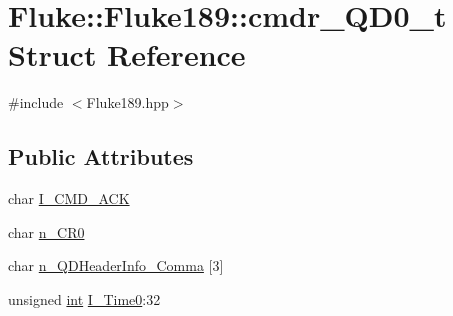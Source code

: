 \hypertarget{structFluke_1_1Fluke189_1_1cmdr__QD0__t}{
\section{Fluke::Fluke189::cmdr\_\-QD0\_\-t Struct Reference}
\label{structFluke_1_1Fluke189_1_1cmdr__QD0__t}
}


{\ttfamily \#include $<$Fluke189.hpp$>$}\subsection*{Public Attributes}
\begin{DoxyCompactItemize}
\item 
char \hyperlink{structFluke_1_1Fluke189_1_1cmdr__QD0__t_ab46dd039cec29950bccb5090537d6272}{I\_\-CMD\_\-ACK}
\item 
char \hyperlink{structFluke_1_1Fluke189_1_1cmdr__QD0__t_a052cc7ae576b3634f2eb8e1a4587c29e}{n\_\-CR0}
\item 
char \hyperlink{structFluke_1_1Fluke189_1_1cmdr__QD0__t_adbec2e8d0ea53d60baa33f2bad91e272}{n\_\-QDHeaderInfo\_\-Comma} \mbox{[}3\mbox{]}
\item 
\hypertarget{structFluke_1_1Fluke189_1_1cmdr__QD0__t_af559256ee7d41725c494325e3f3016dd}{
unsigned \hyperlink{structFluke_1_1Fluke189_1_1cmdr__QD0__t_a6ab6a1621f14f0fe83e89daadd9ba787}{int} \hyperlink{structFluke_1_1Fluke189_1_1cmdr__QD0__t_af559256ee7d41725c494325e3f3016dd}{I\_\-Time0}:32}
\label{structFluke_1_1Fluke189_1_1cmdr__QD0__t_af559256ee7d41725c494325e3f3016dd}


\end{DoxyCompactItemize}
